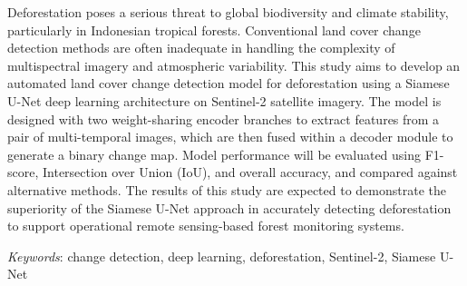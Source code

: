 Deforestation poses a serious threat to global biodiversity and climate stability, particularly in Indonesian tropical forests. Conventional land cover change detection methods are often inadequate in handling the complexity of multispectral imagery and atmospheric variability. This study aims to develop an automated land cover change detection model for deforestation using a Siamese U-Net deep learning architecture on Sentinel-2 satellite imagery. The model is designed with two weight-sharing encoder branches to extract features from a pair of multi-temporal images, which are then fused within a decoder module to generate a binary change map. Model performance will be evaluated using F1-score, Intersection over Union (IoU), and overall accuracy, and compared against alternative methods. The results of this study are expected to demonstrate the superiority of the Siamese U-Net approach in accurately detecting deforestation to support operational remote sensing-based forest monitoring systems.

\vspace{0.3cm}
\noindent
\textit{Keywords}: change detection, deep learning, deforestation, Sentinel-2, Siamese U-Net
